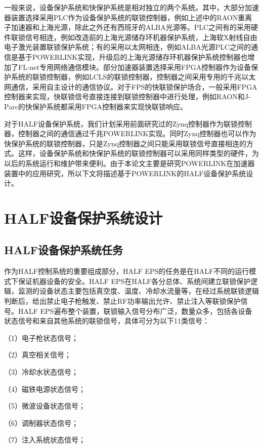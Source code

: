 一般来说，设备保护系统和快保护系统是相对独立的两个系统。其中，大部分加速器装置选择采用PLC作为设备保护系统的联锁控制器，例如上述中的RAON重离子加速器和上海光源，除此之外还有西班牙的ALBA光源等。PLC之间有的采用硬件联锁信号相连，例如改造前的上海光源储存环机器保护系统，上海软X射线自由电子激光装置联锁保护系统\cite{yu2018}；有的采用以太网相连，例如ALBA光源PLC之间的通信是基于POWERLINK实现\cite{Alba-eps}，升级后的上海光源储存环机器保护系统控制器也增加了FL-net专用网络通信模块\cite{yu2020}。部分加速器装置选择采用FPGA控制器作为设备保护系统的联锁控制器，例如LCLS的联锁控制器，控制器之间采用专用的千兆以太网通信，采用自主设计的通信协议\cite{Norum-2009}。对于FPS的快联锁保护场合，一般采用FPGA控制器来实现，快联锁信号直接连接到联锁控制器中进行处理，例如RAON和J-Parc的快保护系统都采用FPGA控制器来实现快联锁响应\cite{jparc}。

对于HALF设备保护系统，我们计划采用前面研究过的Zynq控制器作为联锁控制器，控制器之间的通信通过千兆POWERLINK实现。同时Zynq控制器也可以作为快保护系统的联锁控制器，只是Zynq控制器之间只能采用联锁信号直接相连的方式。这样，设备保护系统和快保护系统的联锁控制器可以采用同样类型的硬件，为以后的系统运行和维护带来便利。由于本论文主要是研究POWERLINK在加速器装置中的应用研究，所以下文将描述基于POWERLINK的HALF设备保护系统设计。


\section{HALF设备保护系统设计}

\subsection{HALF设备保护系统任务}

作为HALF控制系统的重要组成部分，HALF EPS的任务是在HALF不同的运行模式下保证机器设备的安全。HALF EPS在HALF各分总体、系统间建立联锁保护逻辑，监测的设备状态主要包括真空度、温度、冷却水流量等，在经过系统联锁逻辑判断后，给出禁止电子枪触发、禁止RF功率输出允许、禁止注入等联锁保护信号。HALF EPS遍布整个装置，联锁输入信号分布广泛，数量众多，包括各设备状态信号和来自其他系统的联锁信号，具体可分为以下11类信号：

（1）电子枪状态信号；

（2）真空相关信号；

（3）冷却水状态信号；

（4）磁铁电源状态信号；

（5）微波设备状态信号；

（6）调制器状态信号；

（7）注入系统状态信号；

